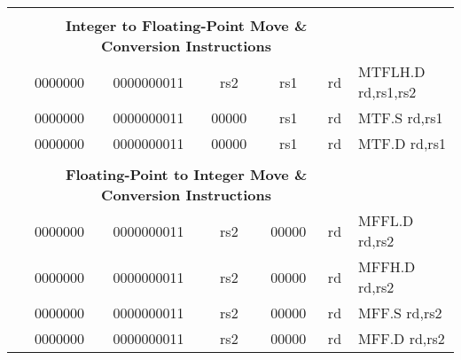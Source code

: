 \begin{table}[p]
\begin{small}
\begin{center}
\begin{tabular}{rcccccccccl}
&
\multicolumn{9}{c}{} & \\
&
\multicolumn{9}{c}{\bf Integer to Floating-Point Move \& Conversion Instructions} & \\
\cline{2-10}
  

&
\multicolumn{1}{|c|}{0000000} &
\multicolumn{5}{c|}{0000000011} &
\multicolumn{1}{c|}{rs2} &
\multicolumn{1}{c|}{rs1} &
\multicolumn{1}{c|}{rd} & MTFLH.D rd,rs1,rs2 \\
\cline{2-10}
  

&
\multicolumn{1}{|c|}{0000000} &
\multicolumn{5}{c|}{0000000011} &
\multicolumn{1}{c|}{00000} &
\multicolumn{1}{c|}{rs1} &
\multicolumn{1}{c|}{rd} & MTF.S rd,rs1 \\
\cline{2-10}
  

&
\multicolumn{1}{|c|}{0000000} &
\multicolumn{5}{c|}{0000000011} &
\multicolumn{1}{c|}{00000} &
\multicolumn{1}{c|}{rs1} &
\multicolumn{1}{c|}{rd} & MTF.D rd,rs1 \\
\cline{2-10}
  

&
\multicolumn{9}{c}{} & \\
&
\multicolumn{9}{c}{\bf Floating-Point to Integer Move \& Conversion Instructions} & \\
\cline{2-10}
  

&
\multicolumn{1}{|c|}{0000000} &
\multicolumn{5}{c|}{0000000011} &
\multicolumn{1}{c|}{rs2} &
\multicolumn{1}{c|}{00000} &
\multicolumn{1}{c|}{rd} & MFFL.D rd,rs2 \\
\cline{2-10}
  

&
\multicolumn{1}{|c|}{0000000} &
\multicolumn{5}{c|}{0000000011} &
\multicolumn{1}{c|}{rs2} &
\multicolumn{1}{c|}{00000} &
\multicolumn{1}{c|}{rd} & MFFH.D rd,rs2 \\
\cline{2-10}
  

&
\multicolumn{1}{|c|}{0000000} &
\multicolumn{5}{c|}{0000000011} &
\multicolumn{1}{c|}{rs2} &
\multicolumn{1}{c|}{00000} &
\multicolumn{1}{c|}{rd} & MFF.S rd,rs2 \\
\cline{2-10}
  

&
\multicolumn{1}{|c|}{0000000} &
\multicolumn{5}{c|}{0000000011} &
\multicolumn{1}{c|}{rs2} &
\multicolumn{1}{c|}{00000} &
\multicolumn{1}{c|}{rd} & MFF.D rd,rs2 \\
\cline{2-10}
  

\end{tabular}
\end{center}
\end{small}

\label{instr-table}
\end{table}
  

